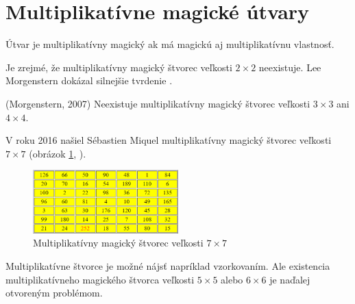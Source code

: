 \section{Multiplikatívne magické útvary}
\begin{definition} Útvar je multiplikatívny magický ak má magickú aj multiplikatívnu vlastnosť.
\end{definition}

Je zrejmé, že multiplikatívny magický štvorec veľkosti $2 \times 2$ neexistuje. Lee Morgenstern dokázal silnejšie tvrdenie \cite{multimagie}.

\begin{theorem} (Morgenstern, 2007) Neexistuje multiplikatívny magický štvorec veľkosti $3 \times 3$ ani $4 \times 4$.
\end{theorem}

V roku 2016 našiel Sébastien Miquel multiplikatívny magický štvorec veľkosti $7 \times 7$ (obrázok \ref{obr:fig_miquel_addmult_7x7}, \cite{multimagie}).

\begin{figure}[H]
\centerline{\includegraphics[width=0.5\textwidth]{images/miquel_addmult_7x7}}
\caption[Multiplikatívny magický štvorec veľkosti $7 \times 7$]{Multiplikatívny magický štvorec veľkosti $7 \times 7$ \cite{multimagie}}
\label{obr:fig_miquel_addmult_7x7}
\end{figure}

Multiplikatívne štvorce je možné nájsť napríklad vzorkovaním. Ale existencia multiplikatívneho magického štvorca veľkosti $5 \times 5$ alebo $6 \times 6$ je naďalej otvoreným problémom.












